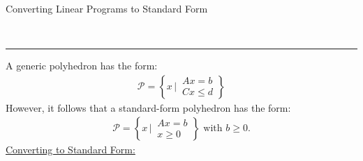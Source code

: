 \documentclass{article}
\newcommand{\header}[1]{\begin{large}\noindent #1\end{large}\\\rule{\textwidth}{0.5pt}}
\newcommand{\sheader}[1]{\underline{#1:}}
\newcommand{\curly}[1]{\left\{#1\right\}}
\begin{document}
\header{Converting Linear Programs to Standard Form}

A generic polyhedron has the form:
\begin{align*}
    \mathcal{P} = \curly{x \,\Biggr\lvert\, \begin{matrix}
        Ax = b \\ Cx \leq d
    \end{matrix}}
\end{align*}
However, it follows that a standard-form polyhedron has the form:
\begin{align*}
    \mathcal{P} = \curly{x \,\Biggr\lvert\, \begin{matrix}
        Ax = b\\ x\geq 0
    \end{matrix}} \textrm{  with  } b \geq 0.
\end{align*}
\sheader{Converting to Standard Form}
\end{document}
